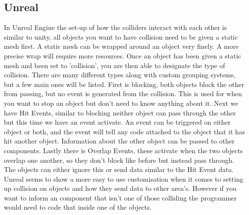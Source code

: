 \documentclass{scrartcl}
\begin{document}
	\subsection{Unreal}
	In Unreal Engine the set-up of how the colliders interact with each other is similar to unity, all objects you want to have collision need to be given a static mesh first. A static mesh can be wrapped around an object very finely. A more precise wrap will require more resources\cite{staticmeshes_2018}. Once an object has been given a static mesh and been set to 'collision', you are then able to designate the type of collision. There are many different types along with custom grouping systems, but a few main ones will be listed\cite{collisionfilteringinunrealengine4_2018}. First is blocking, both objects block the other from passing, but no event is generated from the collision. This is used for when you want to stop an object but don't need to know anything about it. Next we have Hit Events, similar to blocking neither object can pass through the other but this time we have an event activate. An event can be triggered on either object or both, and the event will tell any code attached to the object that it has hit another object. Information about the other object can be passed to other components. Lastly there is Overlap Events, these activate when the two objects overlap one another, so they don't block like before but instead pass through. The objects can either ignore this or send data similar to the Hit Event data\cite{UnrealCollision}. Unreal seems to show a more easy to use customisation when it comes to setting up collision on objects and how they send data to other area's. However if you want to inform an component that isn't one of those colliding the programmer would need to code that inside one of the objects.
	
\end{document}
